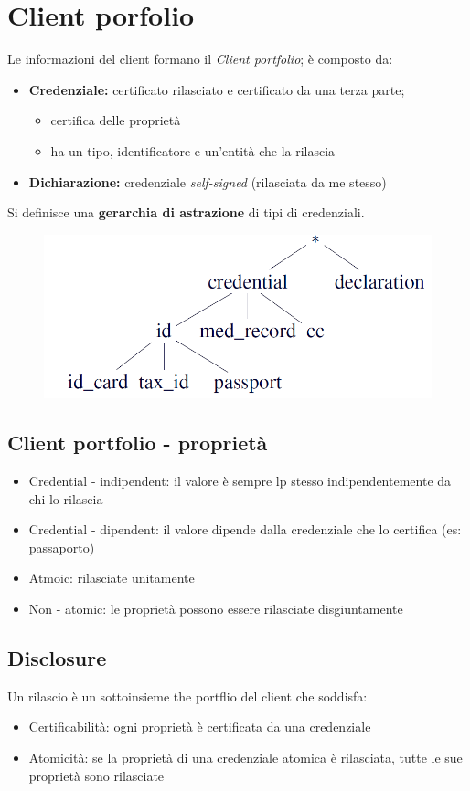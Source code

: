 \documentclass{report}
\begin{document}
\section{Client porfolio}
Le informazioni del client formano il  \textit{Client portfolio}; è composto da:
\begin{itemize}
    \item \textbf{Credenziale:} certificato rilasciato e certificato da una terza parte; 
    \begin{itemize}
        \item certifica delle proprietà
        \item ha un tipo, identificatore e un'entità che la rilascia
    \end{itemize}
    \item \textbf{Dichiarazione:} credenziale \textit{self-signed} (rilasciata da me stesso)
\end{itemize}

\noindent Si definisce una \textbf{gerarchia di astrazione} di tipi di credenziali.

\begin{figure}[ht]
    \centering
    \includegraphics[width=0.7\linewidth]{images/client portfolio.png}
\end{figure}

\subsection{Client portfolio - proprietà}
\begin{itemize}
    \item Credential - indipendent: il valore è sempre lp stesso indipendentemente da chi lo rilascia
    \item Credential - dipendent: il valore dipende dalla credenziale che lo certifica (es: passaporto)
    \item Atmoic: rilasciate unitamente 
    \item Non - atomic: le proprietà possono essere rilasciate disgiuntamente 
\end{itemize}

\subsection{Disclosure}
Un rilascio è un sottoinsieme the portflio del client che soddisfa:
\begin{itemize}
    \item Certificabilità: ogni proprietà è certificata da una credenziale
    \item Atomicità: se la proprietà di una credenziale atomica è rilasciata, tutte le sue proprietà sono rilasciate 
\end{itemize}
\end{document}
